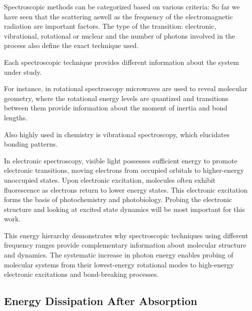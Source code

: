 \noindent Spectroscopic methods can be categorized based on various criteria:
So far we have seen that the scattering aswell as the frequency of the electromagnetic radiation are important factors. The type of the transition: electronic, vibrational, rotational or nuclear and the number of photons involved in the process also define the exact technique used.

\noindent Each spectroscopic technique provides different information about the system under study.

For instance, in rotational spectroscopy microwaves are used to reveal molecular geometry, where the rotational energy levels are quantized and transitions between them provide information about the moment of inertia and bond lengths.

Also highly used in chemistry is vibrational spectroscopy, which elucidates bonding patterns.

In electronic spectroscopy, visible light possesses sufficient energy to promote electronic transitions, moving electrons from occupied orbitals to higher-energy unoccupied states. Upon electronic excitation, molecules often exhibit fluorescence as electrons return to lower energy states. This electronic excitation forms the basis of photochemistry and photobiology.
Probing the electronic structure and looking at excited state dynamics will be most important for this work.

\noindent This energy hierarchy demonstrates why spectroscopic techniques using different frequency ranges provide complementary information about molecular structure and dynamics. The systematic increase in photon energy enables probing of molecular systems from their lowest-energy rotational modes to high-energy electronic excitations and bond-breaking processes.


\subsection{Energy Dissipation After Absorption}
\label{subsec:energy_dissipation}

